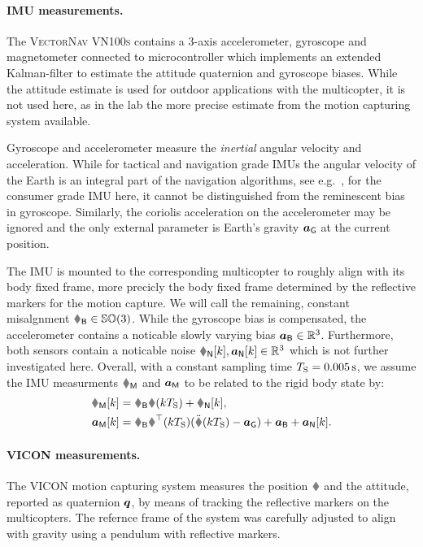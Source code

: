 \paragraph{IMU measurements.}
The \textsc{VectorNav VN100s} contains a 3-axis accelerometer, gyroscope and magnetometer connected to microcontroller which implements an extended Kalman-filter to estimate the attitude quaternion and gyroscope biases.
While the attitude estimate is used for outdoor applications with the multicopter, it is not used here, as in the lab the more precise estimate from the motion capturing system available.

Gyroscope and accelerometer measure the \textit{inertial} angular velocity and acceleration.
While for tactical and navigation grade IMUs the angular velocity of the Earth is an integral part of the navigation algorithms, see e.g.\ \cite{Savage:Strapdown1}, for the consumer grade IMU here, it cannot be distinguished from the reminescent bias in gyroscope.
Similarly, the coriolis acceleration on the accelerometer may be ignored and the only external parameter is Earth's gravity $\boldsymbol{a}_{\mathsf{G}}$ at the current position.

The IMU is mounted to the corresponding multicopter to roughly align with its body fixed frame, more precicly the body fixed frame determined by the reflective markers for the motion capture.
We will call the remaining, constant misalgnment $\RIMUBR \in \SpecialOrthogonalGroup(3)$.
While the gyroscope bias is compensated, the accelerometer contains a noticable slowly varying bias $\boldsymbol{a}_{\mathsf{B}} \in \mathbb{R}^3$.
Furthermore, both sensors contain a noticable noise $\wIMUN[k], \aIMUN[k] \in \RealNum^3$ which is not further investigated here.
Overall, with a constant sampling time $T_{\mathrm{S}}=0.005\,\text{s}$, we assume the IMU measurments $\wIMU$ and $\boldsymbol{a}_{\mathsf{M}}$ to be related to the rigid body state by:
\begin{align}\label{eq:RealizationImuModel}
 \wIMU[k] &= \RIMUBR \w(k\Ts) + \wIMUN[k],
\\
 \aIMU[k] &=  \RIMUBR \R^\top(k\Ts) (\rdd(k\Ts) - \gravityAcc) + \aIMUB + \aIMUN[k]
 .
\end{align}

\paragraph{VICON measurements.}
The \textsc{VICON} motion capturing system measures the position $\r$ and the attitude, reported as quaternion $\boldsymbol{q}$, by means of tracking the reflective markers on the multicopters.
The refernce frame of the system was carefully adjusted to align with gravity using a pendulum with reflective markers.

